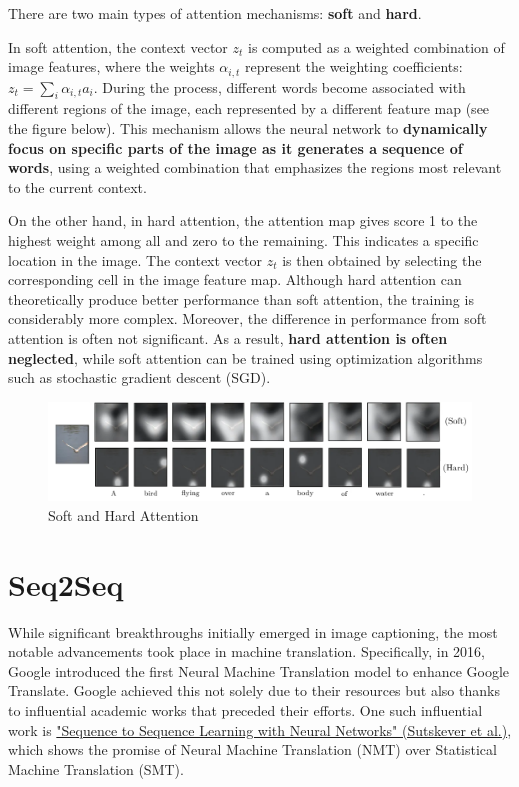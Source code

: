 There are two main types of attention mechanisms: \textbf{soft} and \textbf{hard}.

In soft attention, the context vector $z_t$ is computed as a weighted combination of image features, where the weights $\alpha_{i,t}$ represent the weighting coefficients: $z_t = \sum_{i}\alpha_{i,t}a_i$.  During the process, different words become associated with different regions of the image, each represented by a different feature map (see the figure below). This mechanism allows the neural network to \textbf{dynamically focus on specific parts of the image as it generates a sequence of words}, using a weighted combination that emphasizes the regions most relevant to the current context.

On the other hand, in hard attention, the attention map gives score 1 to the highest weight among all and zero to the remaining. This indicates a specific location in the image. The context vector $z_t$ is then obtained by selecting the corresponding cell in the image feature map. Although hard attention can theoretically produce better performance than soft attention, the training is considerably more complex. Moreover, the difference in performance from soft attention is often not significant. As a result, \textbf{hard attention is often neglected}, while soft attention can be trained using optimization algorithms such as stochastic gradient descent (SGD).

\begin{figure}[!htbp]
    \centering
    \includegraphics[width=\linewidth]{tikz/chapter7 - Attention Types.pdf}
    \caption{Soft and Hard Attention}
\end{figure}

\section{Seq2Seq}

While significant breakthroughs initially emerged in image captioning, the most notable advancements took place in machine translation. Specifically, in 2016, Google introduced the first Neural Machine Translation model to enhance Google Translate.  Google achieved this not solely due to their resources but also thanks to influential academic works that preceded their efforts. One such influential work is  \href{https://arxiv.org/pdf/1409.3215}{"Sequence to Sequence Learning with Neural Networks" (Sutskever et al.)}, which shows the promise of Neural Machine Translation (NMT) over Statistical Machine Translation (SMT).

